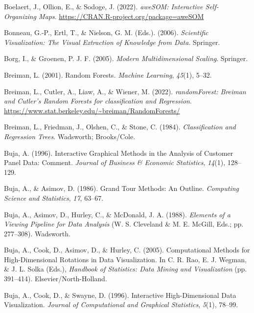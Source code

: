 \documentclass[
  letterpaper,
]{krantz}
\newlength{\cslhangindent}
\newenvironment{CSLReferences}[2] %
 {\begin{list}{}{%
  \setlength{\itemindent}{0pt}
  \setlength{\leftmargin}{0pt}
  \setlength{\parsep}{0pt}
  \ifodd #1
   \setlength{\leftmargin}{\cslhangindent}
   \setlength{\itemindent}{-1\cslhangindent}
  \fi
  \setlength{\itemsep}{#2\baselineskip}}}
 {\end{list}}
\begin{document}
\begin{CSLReferences}{1}{0}
Boelaert, J., Ollion, E., \& Sodoge, J. (2022). \emph{{aweSOM}:
{I}nteractive {S}elf-{O}rganizing {M}aps}.
\url{https://CRAN.R-project.org/package=aweSOM}

Bonneau, G.-P., Ertl, T., \& Nielson, G. M. (Eds.). (2006).
\emph{Scientific {V}isualization: {T}he {V}isual {E}xtraction of
{K}nowledge from {D}ata}. Springer.

Borg, I., \& Groenen, P. J. F. (2005). \emph{Modern {M}ultidimensional
{S}caling}. Springer.

Breiman, L. (2001). Random {F}orests. \emph{Machine Learning},
\emph{45}(1), 5--32.

Breiman, L., Cutler, A., Liaw, A., \& Wiener, M. (2022).
\emph{{randomForest}: {B}reiman and {C}utler's {R}andom {F}orests for
classification and {R}egression}.
\url{https://www.stat.berkeley.edu/~breiman/RandomForests/}

Breiman, L., Friedman, J., Olshen, C., \& Stone, C. (1984).
\emph{Classification and {R}egression {T}rees}. Wadsworth; Brooks/Cole.

Buja, A. (1996). Interactive {G}raphical {M}ethods in the {A}nalysis of
{C}ustomer {P}anel {D}ata: {C}omment. \emph{Journal of Business \&
Economic Statistics}, \emph{14}(1), 128--129.

Buja, A., \& Asimov, D. (1986). {G}rand {T}our {M}ethods: {A}n
{O}utline. \emph{Computing Science and Statistics}, \emph{17}, 63--67.

Buja, A., Asimov, D., Hurley, C., \& McDonald, J. A. (1988).
\emph{{E}lements of a {V}iewing {P}ipeline for {D}ata {A}nalysis} (W. S.
Cleveland \& M. E. McGill, Eds.; pp. 277--308). Wadsworth.

Buja, A., Cook, D., Asimov, D., \& Hurley, C. (2005). {C}omputational
{M}ethods for {H}igh-{D}imensional {R}otations in {D}ata
{V}isualization. In C. R. Rao, E. J. Wegman, \& J. L. Solka (Eds.),
\emph{Handbook of {S}tatistics: {D}ata {M}ining and {V}isualization}
(pp. 391--414). Elsevier/North-Holland.

Buja, A., Cook, D., \& Swayne, D. (1996). {I}nteractive
{H}igh-{D}imensional {D}ata {V}isualization. \emph{Journal of
Computational and Graphical Statistics}, \emph{5}(1), 78--99.


\end{CSLReferences}
\end{document}
